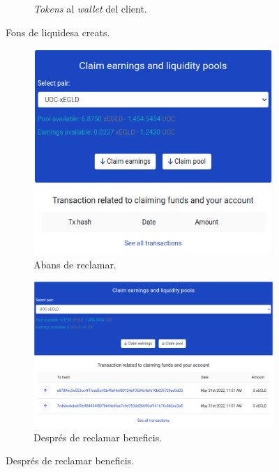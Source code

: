 \documentclass[11pt,a4paper]{article}
\begin{document}
\begin{figure}[!htb]
\begin{subfigure}[b]{0.47\textwidth}
	  \caption{\textit{Tokens} al \textit{wallet} del client.}\label{fig:imp-liqpools2}
	\end{subfigure}\hfill
	\caption{Fons de liquidesa creats.}
\end{figure}

\begin{figure}[!htb]
	\begin{subfigure}[b]{0.32\textwidth}
	  \includegraphics[width=\linewidth]{imp-fons1.png}
	  \caption{Abans de reclamar.}\label{fig:imp-fons1}
	\end{subfigure}\hfill
	\begin{subfigure}[b]{0.32\textwidth}
	  \includegraphics[width=\linewidth]{imp-fons2.png}
	  \caption{Després de reclamar beneficis.}\label{fig:imp-fons2}

\end{subfigure}
\end{figure}
\end{document}
